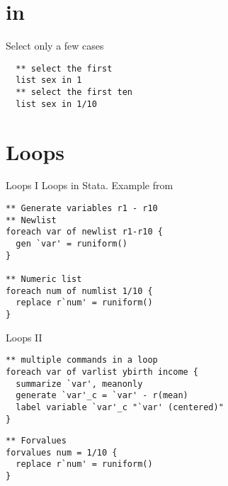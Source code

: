 \section{in}
\begin{frame}[fragile]{in}
Select only a few cases 
\begin{lstlisting}
  ** select the first
  list sex in 1
  ** select the first ten
  list sex in 1/10
\end{lstlisting}

\end{frame}


\section{Loops}
\begin{frame}[fragile]{Loops I}  
Loops in Stata. Example from \textcite[69f.]{Kohler2012}
\begin{lstlisting}
** Generate variables r1 - r10
** Newlist
foreach var of newlist r1-r10 {
  gen `var' = runiform()
}

** Numeric list
foreach num of numlist 1/10 {
  replace r`num' = runiform()
}
\end{lstlisting}
\end{frame}

\begin{frame}[fragile]{Loops II}   
\begin{lstlisting}
** multiple commands in a loop
foreach var of varlist ybirth income {
  summarize `var', meanonly
  generate `var'_c = `var' - r(mean)
  label variable `var'_c "`var' (centered)"
}
\end{lstlisting}

\begin{lstlisting}
** Forvalues
forvalues num = 1/10 {
  replace r`num' = runiform()
}
\end{lstlisting}
\end{frame}

